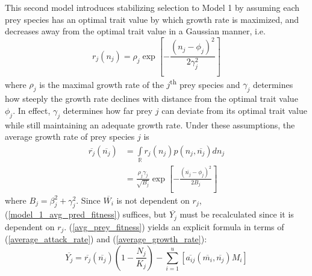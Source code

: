\documentclass{amsart}
\theoremstyle{definition}
\theoremstyle{remark}
\numberwithin{equation}{section}
\begin{document}
This second model introduces stabilizing selection to Model 1 by assuming each prey species has an optimal trait value by which growth rate is maximized, and decreases away from the optimal trait value in a Gaussian manner, i.e.
\begin{equation}
	\label{growth_rate}
	r_j(n_j) = \rho_j\exp{\left[-\frac{(n_j - \phi_j)^2}{2\gamma_j^2}\right]}
\end{equation}
where $\rho_j$ is the maximal growth rate of the $j$\textsuperscript{th} prey species and $\gamma_j$ determines how steeply the growth rate declines with distance from the optimal trait value $\phi_j$.  In effect, $\gamma_j$ determines how far prey $j$ can deviate from its optimal trait value while still maintaining an adequate growth rate.  Under these assumptions, the average growth rate of prey species $j$ is
\begin{equation}
	\label{average_growth_rate}
	\begin{aligned}
		\overline{r_j}(\overline{n_j}) &= \int\limits_{\mathbb{R}}^{}r_j(n_j)p(n_j, \overline{n_j})dn_j \\
		&= \frac{\rho_j\gamma_j}{\sqrt{B_j}}\exp\left[-\frac{(\overline{n_j} - \phi_j)^2}{2B_j}\right]
	\end{aligned}
\end{equation}
where $B_j = \beta_j^2 + \gamma_j^2$.  Since $\overline{W_i}$ is not dependent on $r_j$, (\ref{model_1_avg_pred_fitness}) suffices, but $\overline{Y_j}$ must be recalculated since it is dependent on $r_j$.  (\ref{avg_prey_fitness}) yields an explicit formula in terms of (\ref{average_attack_rate}) and (\ref{average_growth_rate}):
\begin{equation}
	\label{model_2_avg_prey_fitness}
	\overline{Y_j} = \overline{r_j}(\overline{n_j})\left(1 - \frac{N_j}{K_j}\right) - \sum\limits_{i = 1}^{u}\left[\overline{a_{ij}}(\overline{m_i}, \overline{n_j})M_i\right]
\end{equation}
\end{document}
